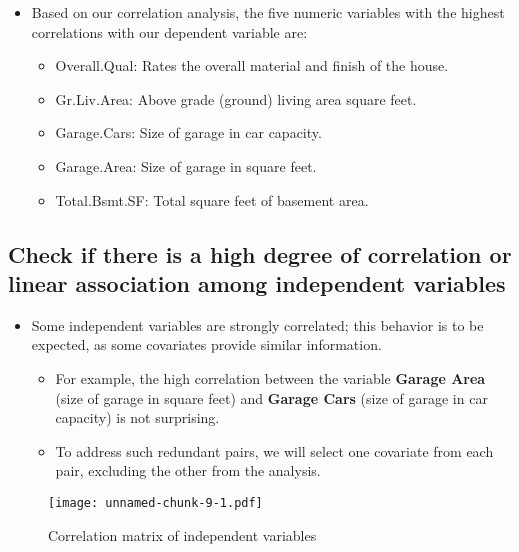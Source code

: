 \documentclass[aoas]{imsart}
\providecommand{\tightlist}{%
  \setlength{\itemsep}{0pt}\setlength{\parskip}{0pt}}
\numberwithin{equation}{section}
\theoremstyle{plain}
\theoremstyle{remark}
\begin{document}
\begin{itemize}
\tightlist
\item
  Based on our correlation analysis, the five numeric variables with
  the highest correlations with our dependent variable are:
    \vspace*{0.2cm}
  \begin{itemize}
  \tightlist
  \item
    Overall.Qual: Rates the overall material and finish of the house.
  \item
    Gr.Liv.Area: Above grade (ground) living area square feet.
  \item
    Garage.Cars: Size of garage in car capacity.
  \item
    Garage.Area: Size of garage in square feet.
  \item
    Total.Bsmt.SF: Total square feet of basement area.
  \end{itemize}
\end{itemize}

\hypertarget{check-if-there-is-a-high-degree-of-correlation-or-linear-association-among-independent-variables}{%
\subsection{Check if there is a high degree of correlation or linear
association among independent
variables}\label{check-if-there-is-a-high-degree-of-correlation-or-linear-association-among-independent-variables}}

\begin{itemize}
\tightlist
\item
  Some independent variables are strongly correlated; this behavior is to be expected, as some covariates provide similar information.
\vspace*{0.2cm}
  \begin{itemize}
  \tightlist
  \item
    For example, the high correlation between the variable
    \textbf{Garage Area} (size of garage in square feet) and
    \textbf{Garage Cars} (size of garage in car capacity) is not
    surprising.
  \item
    To address such redundant pairs, we will select one covariate from each pair, excluding the other from the analysis.
  \end{itemize}
\end{itemize}

\begin{figure}
\centering
\texttt{[image: unnamed-chunk-9-1.pdf]}
\caption{Correlation matrix of independent variables\label{}}
\end{figure}
\end{document}
